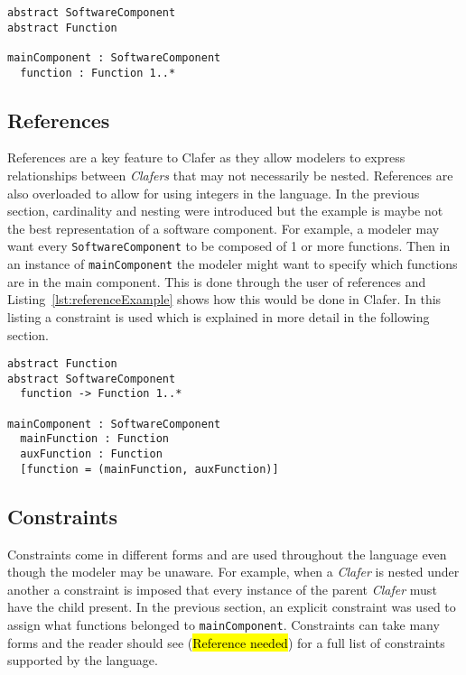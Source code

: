 \documentclass[10pt,oneside]{IEEEtran}
\begin{document}
\begin{lstlisting}[label={lst:cardinalityExample},caption={Example of nesting and cardinality}]
abstract SoftwareComponent
abstract Function

mainComponent : SoftwareComponent
  function : Function 1..*
\end{lstlisting}

\subsection{References}
References are a key feature to Clafer as they allow modelers to express relationships between
\textit{Clafers} that may not necessarily be nested. References are also overloaded to allow
for using integers in the language. In the previous section, cardinality and nesting were introduced
but the example is maybe not the best representation of a software component. For example, a modeler
may want every \lstinline$SoftwareComponent$ to be composed of 1 or more functions. Then in an instance
of \lstinline$mainComponent$ the modeler might want to specify which functions are in the main component.
This is done through the user of references and Listing~\ref{lst:referenceExample} shows how this would
be done in Clafer. In this listing a constraint is used which is explained in more detail in the following
section.

\begin{lstlisting}[label={lst:referenceExample},caption={Example use of references}]
abstract Function
abstract SoftwareComponent
  function -> Function 1..*

mainComponent : SoftwareComponent
  mainFunction : Function
  auxFunction : Function
  [function = (mainFunction, auxFunction)]
\end{lstlisting}

\subsection{Constraints}
Constraints come in different forms and are used throughout the language even though the modeler may be
unaware. For example, when a \textit{Clafer} is nested under another a constraint is imposed that every
instance of the parent \textit{Clafer} must have the child present. In the previous section, an explicit
constraint was used to assign what functions belonged to \lstinline$mainComponent$. Constraints can
take many forms and the reader should see (\hl{Reference needed}) for a full list of constraints
supported by the language.
\end{document}
